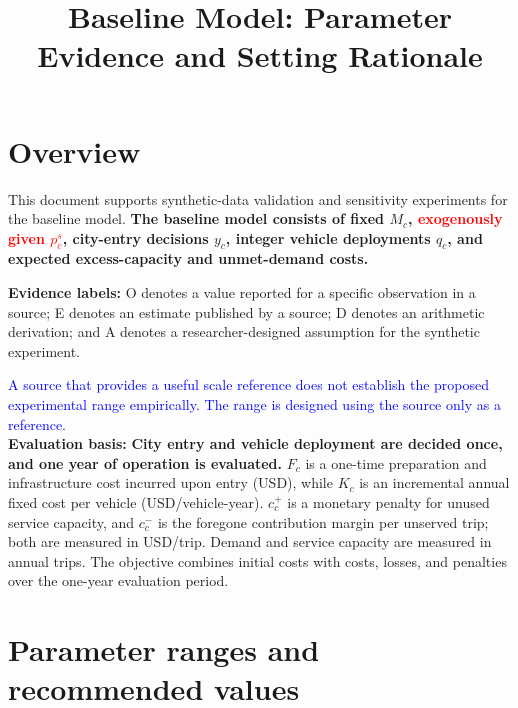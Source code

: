 \documentclass[10pt,a4paper]{article}
\title{Baseline Model: Parameter Evidence and Setting Rationale}
\begin{document}
\maketitle

\section{Overview}

This document supports synthetic-data validation and sensitivity experiments for the baseline model. \textbf{The baseline model consists of fixed $M_c$, \textcolor{red}{exogenously given $p_c^s$}, city-entry decisions $y_c$, integer vehicle deployments $q_c$, and expected excess-capacity and unmet-demand costs.}

\textbf{Evidence labels:} O denotes a value reported for a specific observation in a source; E denotes an estimate published by a source; D denotes an arithmetic derivation; and A denotes a researcher-designed assumption for the synthetic experiment.

\textcolor{blue}{A source that provides a useful scale reference does not establish the proposed experimental range empirically. The range is designed using the source only as a reference.} \\

\textbf{Evaluation basis:} \textbf{City entry and vehicle deployment are decided once, and one year of operation is evaluated.} $F_c$ is a one-time preparation and infrastructure cost incurred upon entry (USD), while $K_c$ is an incremental annual fixed cost per vehicle (USD/vehicle-year). $c_c^+$ is a monetary penalty for unused service capacity, and $c_c^-$ is the foregone contribution margin per unserved trip; both are measured in USD/trip. Demand and service capacity are measured in annual trips. The objective combines initial costs with costs, losses, and penalties over the one-year evaluation period.

\section{Parameter ranges and recommended values}
\end{document}
